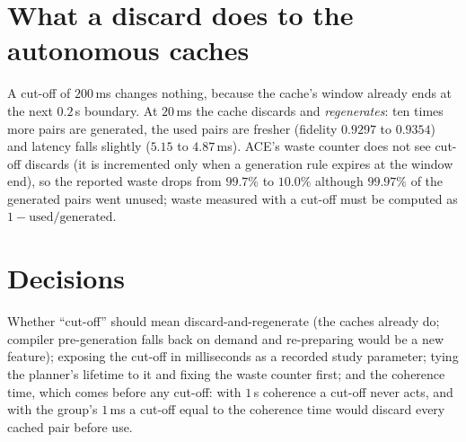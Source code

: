 \section{What a discard does to the autonomous caches}

A cut-off of $200$\,ms changes nothing, because the cache's window already ends at the next $0.2$\,s boundary. At $20$\,ms the cache discards and \emph{regenerates}: ten times more pairs are generated, the used pairs are fresher (fidelity $0.9297$ to $0.9354$) and latency
falls slightly ($5.15$ to $4.87$\,ms). ACE's waste counter does not see cut-off discards (it is incremented only when a generation rule expires at the window end), so the reported waste drops from $99.7\%$ to $10.0\%$ although $99.97\%$ of the generated pairs went unused;
waste measured with a cut-off must be computed as $1-\text{used}/\text{generated}$.

\section{Decisions}
Whether ``cut-off'' should mean discard-and-regenerate (the caches already do; compiler pre-generation falls back on demand and re-preparing would be a new feature); exposing the cut-off in milliseconds as a recorded study parameter; tying the planner's lifetime to it
and fixing the waste counter first; and the coherence time, which comes before any cut-off: with $1$\,s coherence a cut-off never acts, and with the group's $1$\,ms a cut-off equal to the coherence time would discard every cached pair before use.
